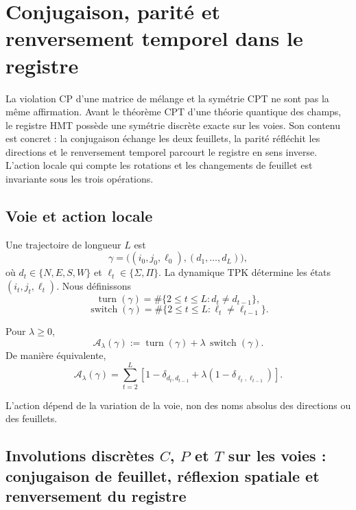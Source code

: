 \chapter{Conjugaison, parité et renversement temporel dans le registre}
\label{chap:cpt-discreto-rutas-rev6}

La violation CP d'une matrice de mélange et la symétrie CPT ne sont pas la même
affirmation. Avant le théorème CPT d'une théorie quantique des champs, le
registre
HMT possède une symétrie discrète exacte sur les voies. Son contenu est concret :
la conjugaison échange les deux feuillets, la parité réfléchit les directions et
le renversement temporel parcourt le registre en sens inverse. L'action locale
qui compte les rotations et les changements de feuillet est invariante sous les trois opérations.

\section{Voie et action locale}

Une trajectoire de longueur \(L\) est
\[
 \gamma=
 \bigl((i_0,j_0,\ell_0),(d_1,\ldots,d_L)\bigr),
\]
où \(d_t\in\{N,E,S,W\}\) et
\(\ell_t\in\{\Sigma,\Pi\}\). La dynamique TPK détermine les états
\((i_t,j_t,\ell_t)\). Nous définissons
\[
 \operatorname{turn}(\gamma)
 =
 \#\{2\leq t\leq L:d_t\neq d_{t-1}\},
\]
\[
 \operatorname{switch}(\gamma)
 =
 \#\{2\leq t\leq L:\ell_t\neq\ell_{t-1}\}.
\]

\begin{definition}
\label{def:accion-minima-cpt-rev6}
Pour \(\lambda\geq0\),
\[
 \mathcal A_\lambda(\gamma)
 :=
 \operatorname{turn}(\gamma)
 +\lambda\,\operatorname{switch}(\gamma).
\]
De manière équivalente,
\[
 \mathcal A_\lambda(\gamma)
 =
 \sum_{t=2}^{L}
 \left[
 1-\delta_{d_t,d_{t-1}}
 +\lambda(1-\delta_{\ell_t,\ell_{t-1}})
 \right].
\]
\end{definition}

L'action dépend de la variation de la voie, non des noms absolus des
directions ou des feuillets.

\section{Involutions discrètes \(C\), \(P\) et \(T\) sur les voies : conjugaison de feuillet, réflexion spatiale et renversement du registre}


